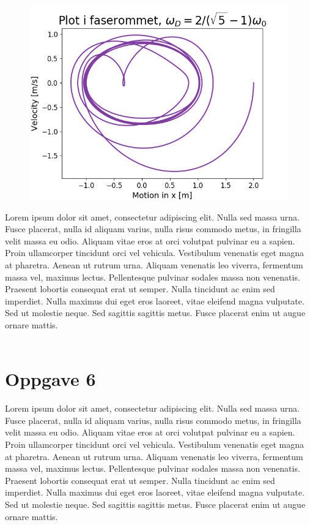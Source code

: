 \documentclass[norsk,a4paper,12pt]{article}
\begin{document}
\begin{figure}[H]
\includegraphics[scale=0.8]{Oppgave5del2.png}
\end{figure}

Lorem ipsum dolor sit amet, consectetur adipiscing elit. Nulla sed massa urna. Fusce placerat, nulla id aliquam varius, nulla risus commodo metus, in fringilla velit massa eu odio. Aliquam vitae eros at orci volutpat pulvinar eu a sapien. Proin ullamcorper tincidunt orci vel vehicula. Vestibulum venenatis eget magna at pharetra. Aenean ut rutrum urna. Aliquam venenatis leo viverra, fermentum massa vel, maximus lectus. Pellentesque pulvinar sodales massa non venenatis. Praesent lobortis consequat erat ut semper. Nulla tincidunt ac enim sed imperdiet. Nulla maximus dui eget eros laoreet, vitae eleifend magna vulputate. Sed ut molestie neque. Sed sagittis sagittis metus. Fusce placerat enim ut augue ornare mattis.
\\
\\

\section*{Oppgave 6}

Lorem ipsum dolor sit amet, consectetur adipiscing elit. Nulla sed massa urna. Fusce placerat, nulla id aliquam varius, nulla risus commodo metus, in fringilla velit massa eu odio. Aliquam vitae eros at orci volutpat pulvinar eu a sapien. Proin ullamcorper tincidunt orci vel vehicula. Vestibulum venenatis eget magna at pharetra. Aenean ut rutrum urna. Aliquam venenatis leo viverra, fermentum massa vel, maximus lectus. Pellentesque pulvinar sodales massa non venenatis. Praesent lobortis consequat erat ut semper. Nulla tincidunt ac enim sed imperdiet. Nulla maximus dui eget eros laoreet, vitae eleifend magna vulputate. Sed ut molestie neque. Sed sagittis sagittis metus. Fusce placerat enim ut augue ornare mattis.
\\
\\
\end{document}
